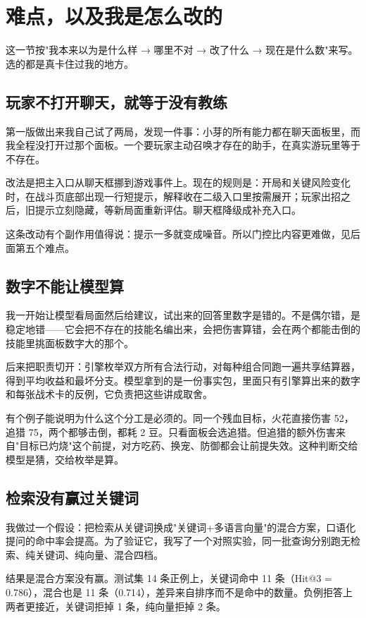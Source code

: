 \section{难点，以及我是怎么改的}

这一节按"我本来以为是什么样 → 哪里不对 → 改了什么 → 现在是什么数"来写。选的都是真卡住过我的地方。

\subsection{玩家不打开聊天，就等于没有教练}

第一版做出来我自己试了两局，发现一件事：小芽的所有能力都在聊天面板里，而我全程没打开过那个面板。一个要玩家主动召唤才存在的助手，在真实游玩里等于不存在。

改法是把主入口从聊天框挪到游戏事件上。现在的规则是：开局和关键风险变化时，在战斗页底部出现一行短提示，解释收在二级入口里按需展开；玩家出招之后，旧提示立刻隐藏，等新局面重新评估。聊天框降级成补充入口。

这条改动有个副作用值得说：提示一多就变成噪音。所以门控比内容更难做，见后面第五个难点。

\subsection{数字不能让模型算}

我一开始让模型看局面然后给建议，试出来的回答里数字是错的。不是偶尔错，是稳定地错——它会把不存在的技能名编出来，会把伤害算错，会在两个都能击倒的技能里挑面板数字大的那个。

后来把职责切开：引擎枚举双方所有合法行动，对每种组合同跑一遍共享结算器，得到平均收益和最坏分支。模型拿到的是一份事实包，里面只有引擎算出来的数字和每张战术卡的反例，它负责把这些讲成取舍。

有个例子能说明为什么这个分工是必须的。同一个残血目标，火花直接伤害 52，追猎 75，两个都够击倒，都耗 2 豆。只看面板会选追猎。但追猎的额外伤害来自"目标已灼烧"这个前提，对方吃药、换宠、防御都会让前提失效。这种判断交给模型是猜，交给枚举是算。

\subsection{检索没有赢过关键词}

我做过一个假设：把检索从关键词换成"关键词+多语言向量"的混合方案，口语化提问的命中率会提高。为了验证它，我写了一个对照实验，同一批查询分别跑无检索、纯关键词、纯向量、混合四档。

结果是混合方案没有赢。测试集 14 条正例上，关键词命中 11 条（Hit@3 = 0.786），混合也是 11 条（0.714），差异来自排序而不是命中的数量。负例拒答上两者更接近，关键词拒掉 1 条，纯向量拒掉 2 条。

